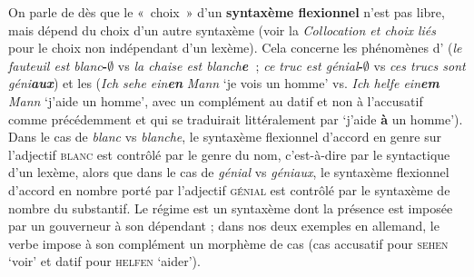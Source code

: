 {    On parle de  dès que le «~choix~» d’un \textbf{syntaxème flexionnel} n’est pas libre, mais dépend du choix d’un autre syntaxème (voir la  \textit{Collocation et choix liés} pour le choix non indépendant d’un lexème). Cela concerne les phénomènes d’ (\textit{le fauteuil est blanc}\textbf{{}-}\textrm{\textbf{${\emptyset}$}} vs \textit{la chaise est blanch}\textbf{\textit{e~}}; \textit{ce truc est génial}\textbf{{}-}\textrm{\textbf{${\emptyset}$}} vs \textit{ces trucs sont géni}\textbf{\textit{aux}}) et les  (\textit{Ich sehe ein}\textbf{\textit{en}} \textit{Mann} ‘je vois un homme’ vs. \textit{Ich helfe ein}\textbf{\textit{em}} \textit{Mann} ‘j’aide un homme’, avec un complément au datif et non à l’accusatif comme précédemment et qui se traduirait littéralement par ‘j’aide \textbf{à} un homme’). Dans le cas de \textit{blanc} vs \textit{blanche}, le syntaxème flexionnel d’accord en genre sur l’adjectif \textsc{blanc} est contrôlé par le genre du nom, c’est-à-dire par le syntactique d’un lexème, alors que dans le cas de \textit{génial} vs \textit{géniaux}, le syntaxème flexionnel d’accord en nombre porté par l’adjectif \textsc{génial} est contrôlé par le syntaxème de nombre du substantif. Le régime est un syntaxème dont la présence est imposée par un gouverneur à son dépendant ; dans nos deux exemples en allemand, le verbe impose à son complément un morphème de cas (cas accusatif pour \textsc{sehen} ‘voir’ et datif pour \textsc{helfen} ‘aider’).

}
